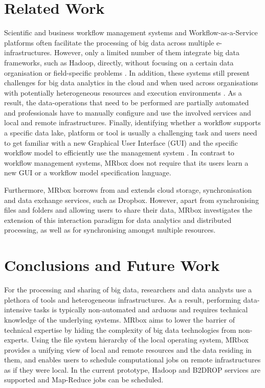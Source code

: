 \section{Related Work}
Scientific and business workflow management systems and Workflow-as-a-Service platforms \cite[etc.]{kepler,pegasus,dare} often facilitate the processing of big data across multiple e-infrastructures. However, only a limited number of them integrate big data frameworks, such as Hadoop, directly, without focusing on a certain data organisation or field-specific problems \cite{wang2009kepler}. In addition, these systems still present challenges for big data analytics in the cloud and when used across organisations with potentially heterogeneous resources and execution environments \cite{khan2019big}. As a result, the data-operations that need to be performed are partially automated and professionals have to manually configure and use the involved services and local and remote infrastructures. Finally, identifying whether a workflow supports a specific data lake, platform or tool is usually a challenging task and users need to get familiar with a new Graphical User Interface (GUI) and the specific workflow model to efficiently use the management system \cite{khan2019big, wang2009kepler}. In contrast to workflow management systems, MRbox does not require that its users learn a new GUI or a workflow model specification language.

Furthermore, MRbox borrows from and extends cloud storage, synchronisation and data exchange services, such as Dropbox. However, apart from synchronising files and folders and allowing users to share their data, MRbox investigates the extension of this interaction paradigm for data analytics and distributed processing, as well as for synchronising amongst multiple resources.

\section{Conclusions and Future Work}
For the processing and sharing of big data, researchers and data analysts use a plethora of tools and heterogeneous infrastructures. As a result, performing data-intensive tasks is typically non-automated and arduous and requires technical knowledge of the underlying systems. MRbox aims to lower the barrier of technical expertise by hiding the complexity of big data technologies from non-experts. Using the file system hierarchy of the local operating system, MRbox provides a unifying view of local and remote resources and the data residing in them, and enables users to schedule computational jobs on remote infrastructures as if they were local. In the current prototype, Hadoop and B2DROP services are supported and Map-Reduce jobs can be scheduled.

